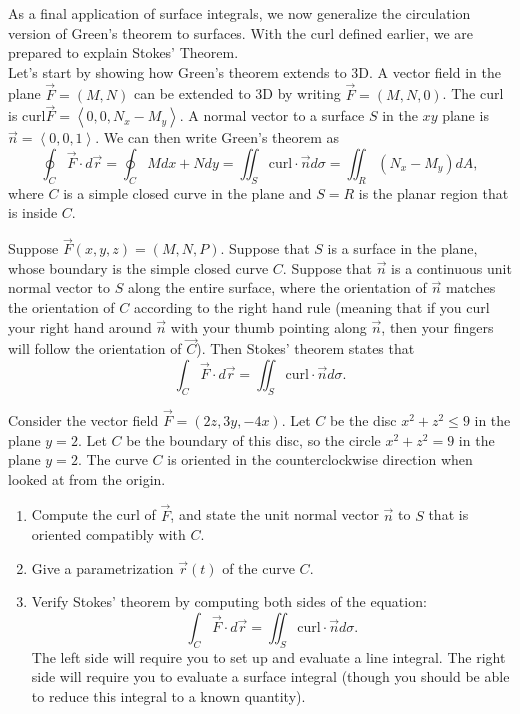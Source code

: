 
As a final application of surface integrals, we now generalize the circulation version of Green's theorem to surfaces. With the curl defined earlier, we are prepared to explain Stokes' Theorem.\\

\indent Let's start by showing how Green's theorem extends to 3D. A vector field in the plane $\vec F = \left(M,N\right)$ can be extended to 3D by writing $\vec F = \left(M,N,0\right)$.  The curl is $\text{curl}\vec F = \left<0,0,N_x-M_y\right>$.  A normal vector to a surface $S$ in the $xy$ plane is $\vec n = \left<0,0,1\right>$. We can then write Green's theorem as $$\oint_C\vec F\cdot d\vec r = \oint_C Mdx+Ndy = \iint_S \text{curl}\cdot \vec n d\sigma = \iint_R \left(N_x-M_y\right) dA, $$ where $C$ is a simple closed curve in the plane and $S=R$ is the planar region that is inside $C$. 

\begin{theorem}
Suppose $\vec F(x,y,z) = (M,N,P)$.  Suppose that $S$ is a surface in the plane, whose boundary is the simple closed curve $C$. Suppose that $\vec n$ is a continuous unit normal vector to $S$ along the entire surface, where the orientation of $\vec n$ matches the orientation of $C$ according to the right hand rule (meaning that if you curl your right hand around $\vec n$ with your thumb pointing along $\vec n$, then your fingers will follow the orientation of $\vec C$). Then Stokes' theorem states that 
$$\int_C\vec F\cdot d\vec r = \iint_S \text{curl}\cdot \vec n d\sigma .$$
\end{theorem}


\begin{problem}
 Consider the vector field $\vec F = (2z,3y,-4x)$. Let $C$ be the disc $x^2+z^2\leq 9$ in the plane $y=2$.  Let $C$ be the boundary of this disc, so the circle $x^2+z^2=9$ in the plane $y=2$.  The curve $C$ is oriented in the counterclockwise direction when looked at from the origin.
\begin{enumerate}
 \item Compute the curl of $\vec F$, and state the unit normal vector $\vec n$ to $S$ that is oriented compatibly with $C$.
 \item Give a parametrization $\vec r(t)$ of the curve $C$. 
 \item Verify Stokes' theorem by computing both sides of the equation: $$\int_C\vec F\cdot d\vec r = \iint_S \text{curl}\cdot \vec n d\sigma.$$
 The left side will require you to set up and evaluate a line integral.  The right side will require you to evaluate a surface integral (though you should be able to reduce this integral to a known quantity).
\end{enumerate}
  
\end{problem}



